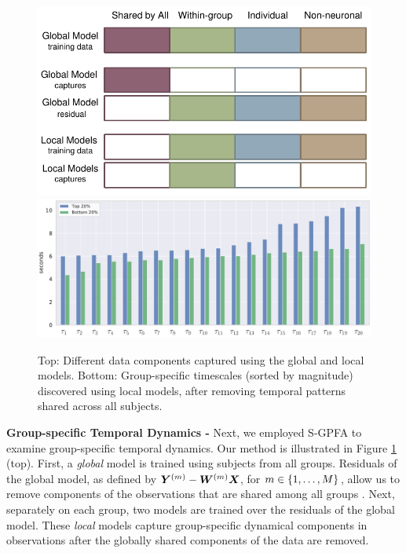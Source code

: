 \begin{figure}[tb]
    \centering
    \includegraphics[width=.5\linewidth]{figures/ch1/group_tf_schematic_2.pdf}
    \vspace{0.4em}
    \includegraphics[width=0.9\linewidth]{figures/ch1/group_td.pdf}
    \caption{Top: Different data components captured using the global and local models. Bottom: Group-specific timescales (sorted by magnitude) discovered using local models, after removing temporal patterns shared across all subjects.}\label{fig:gtd}
\end{figure}

\textbf{Group-specific Temporal Dynamics - }
Next, we employed S-GPFA to examine group-specific temporal dynamics. Our method is illustrated in Figure \ref{fig:gtd} (top). First, a \textit{global} model is trained using subjects from all groups. Residuals of the global model, as defined by $\bm{Y}^{(m)} - \bm{W}^{(m)} \bm{X}$, for $m \in \{1, \ldots, M \}$, allow us to remove components of the observations that are shared among all groups \cite{srm}. Next, separately on each group, two models are trained over the residuals of the global model. These \textit{local} models capture group-specific dynamical components in observations after the globally shared components of the data are removed. 

